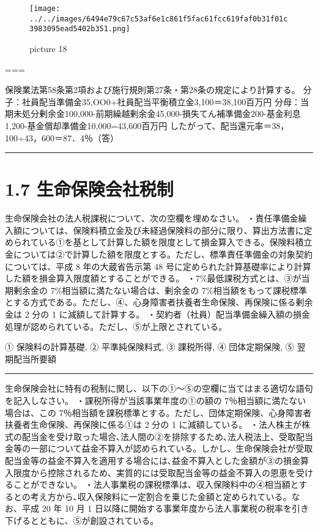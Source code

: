 \documentclass[report,gutter=10mm,fore-edge=10mm,uplatex,dvipdfmx]{jlreq}
\begin{document}
\begin{figure}
\centering
\texttt{[image: ../../images/6494e79c67c53af6e1c861f5fac61fcc619faf0b31f01c3983095ead5402b351.png]}
\caption{picture 18}
\end{figure}

===


保険業法第58条第2項および施行規則第27条・第28条の規定により計算する。
分子：社員配当準備金35,OO0+社員配当平衡積立金3,100＝38,100百万円
分母：当期未処分剰余金100,000-前期繰越剰余金45,000-損失てん補準備金200-基金利息1,200-基金償却準備金10,000=43,600百万円
したがって、配当還元率＝38，100÷43，600＝87．4％（答）

\begin{center}\rule{0.5\linewidth}{0.5pt}\end{center}

\section{1.7
生命保険会社税制}


生命保険会社の法人税課税について、次の空欄を埋めなさい。
・責任準備金繰入額については、保険料積立金及び未経過保険料の部分に限り、算出方法書に定められている①を基として計算した額を限度として損金算入できる。保険料積立金については②で計算した額を限度とする。ただし、標準責任準備金の対象契約については、平成
8 年の大蔵省告示第 48
号に定められた計算基礎率により計算した額を損金算入限度額とすることができる。
・7\%最低課税方式とは、③が当期剰余金の
7\%相当額に満たない場合は、剰余金の
7\%相当額をもって課税標準とする方式である。ただし、④、心身障害者扶養者生命保険、再保険に係る剰余金は
2 分の 1 に減額して計算する。
・契約者（社員）配当準備金繰入額の損金処理が認められている。ただし、⑤が上限とされている。


① 保険料の計算基礎, ② 平準純保険料式, ③ 課税所得, ④ 団体定期保険, ⑤
翌期配当所要額

\begin{center}\rule{0.5\linewidth}{0.5pt}\end{center}


生命保険会社に特有の税制に関し、以下の①～⑤の空欄に当てはまる適切な語句を記入しなさい。
・課税所得が当該事業年度の①の額の 7％相当額に満たない場合は、この
7％相当額を課税標準とする。ただし、団体定期保険、心身障害者扶養者生命保険、再保険に係る①は
2 分の 1 に減額している。
・法人株主が株式の配当金を受け取った場合､法人間の②を排除するため､法人税法上、受取配当金等の一部について益金不算入が認められている。しかし、生命保険会社が受取配当金等の益金不算入を適用する場合には､益金不算入とした金額が③の損金算入限度から控除されるため、実質的には受取配当金等の益金不算入の恩恵を受けることができない。
・法人事業税の課税標準は、収入保険料中の④相当額とするとの考え方から､収入保険料に一定割合を乗じた金額と定められている。なお、平成
20 年 10 月 1
日以降に開始する事業年度から法人事業税の税率を引き下げるとともに、⑤が創設されている。
\end{document}
